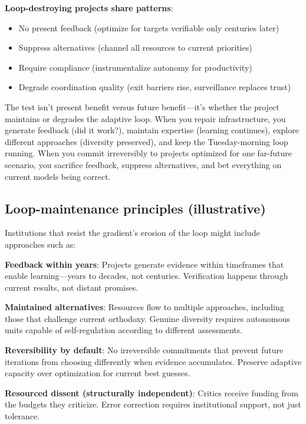 \documentclass[12pt,a4paper]{article}
\begin{document}
\textbf{Loop-destroying projects share patterns}:
\begin{itemize}
\item No present feedback (optimize for targets verifiable only centuries later)
\item Suppress alternatives (channel all resources to current priorities)
\item Require compliance (instrumentalize autonomy for productivity)
\item Degrade coordination quality (exit barriers rise, surveillance replaces trust)
\end{itemize}

The test isn't present benefit versus future benefit---it's whether the project maintains or degrades the adaptive loop. When you repair infrastructure, you generate feedback (did it work?), maintain expertise (learning continues), explore different approaches (diversity preserved), and keep the Tuesday-morning loop running. When you commit irreversibly to projects optimized for one far-future scenario, you sacrifice feedback, suppress alternatives, and bet everything on current models being correct.

\subsection{Loop-maintenance principles (illustrative)}

Institutions that resist the gradient's erosion of the loop might include approaches such as:

\textbf{Feedback within years}: Projects generate evidence within timeframes that enable learning---years to decades, not centuries. Verification happens through current results, not distant promises.

\textbf{Maintained alternatives}: Resources flow to multiple approaches, including those that challenge current orthodoxy. Genuine diversity requires autonomous units capable of self-regulation according to different assessments.

\textbf{Reversibility by default}: No irreversible commitments that prevent future iterations from choosing differently when evidence accumulates. Preserve adaptive capacity over optimization for current best guesses.

\textbf{Resourced dissent (structurally independent)}: Critics receive funding from the budgets they criticize. Error correction requires institutional support, not just tolerance.
\end{document}
